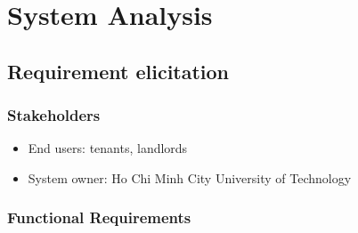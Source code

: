 \chapter{System Analysis}
\section{Requirement elicitation}
\subsection{Stakeholders}
\begin{itemize}
    \item End users: tenants, landlords
    \item System owner: Ho Chi Minh City University of Technology
\end{itemize}
\subsection{Functional Requirements}
